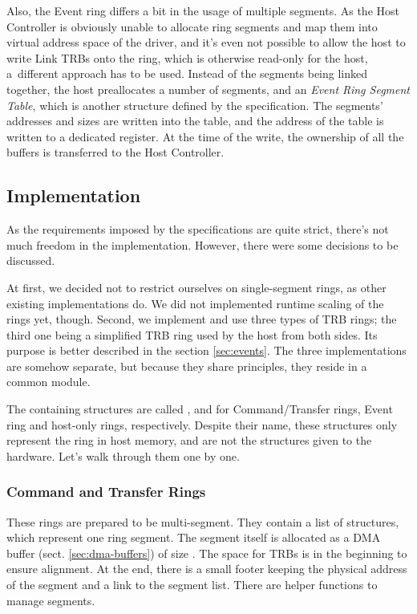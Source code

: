 Also, the Event ring differs a bit in the usage of multiple segments. As the
Host Controller is obviously unable to allocate ring segments and map them into
virtual address space of the driver, and it's even not possible to allow the
host to write Link TRBs onto the ring, which is otherwise read-only for the
host, a~different approach has to be used. Instead of the segments being linked
together, the host preallocates a number of segments, and an \emph{Event Ring
Segment Table}, which is another structure defined by the specification. The
segments' addresses and sizes are written into the table, and the address of
the table is written to a dedicated register. At the time of the write, the
ownership of all the buffers is transferred to the Host Controller.

\subsection{Implementation}

As the requirements imposed by the specifications are quite strict, there's not
much freedom in the implementation. However, there were some decisions to be
discussed.

At first, we decided not to restrict ourselves on single-segment rings, as
other existing implementations do. We did not implemented runtime scaling of
the rings yet, though. Second, we implement and use three types of TRB rings;
the third one being a simplified TRB ring used by the host from both sides. Its
purpose is better described in the section \ref{sec:events}. The three
implementations are somehow separate, but because they share principles, they
reside in a common module.

The containing structures are called ,
 and  for Command/Transfer
rings, Event ring and host-only rings, respectively. Despite their name, these
structures only represent the ring in host memory, and are not the structures
given to the hardware. Let's walk through them one by one.

\subsubsection{Command and Transfer Rings}

These rings are prepared to be multi-segment. They contain a list of
 structures, which represent one ring segment. The
segment itself is allocated as a DMA buffer (sect. \ref{sec:dma-buffers}) of
size . The space for TRBs is in the beginning to ensure
alignment. At the end, there is a small footer keeping the physical address of
the segment and a link to the segment list. There are helper functions to
manage segments.

